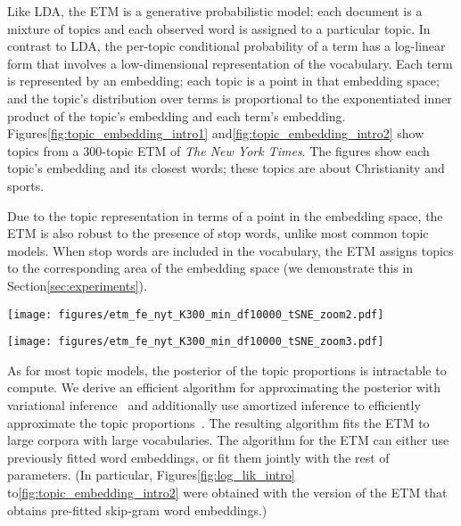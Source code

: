 \documentclass[11pt,a4paper]{article}
\begin{document}
Like \gls{LDA}, the \gls{ETM} is a generative probabilistic model:
each document is a mixture of topics and each observed word is
assigned to a particular topic.  In contrast to \gls{LDA},
the per-topic conditional probability of a term has a log-linear form
that involves a low-dimensional representation of the vocabulary.
Each term is represented by an embedding; each topic is a point in
that embedding space; and the topic's distribution over terms is
proportional to the exponentiated inner product of the topic's
embedding and each term's embedding.  Figures\nobreakspace \ref {fig:topic_embedding_intro1} and\nobreakspace  \ref {fig:topic_embedding_intro2}
show topics from a $300$-topic \gls{ETM} of \textit{The New York Times}. The figures show each topic's embedding and its closest words; these topics are about Christianity and sports.

Due to the topic representation in terms of a point in the embedding space,
the \gls{ETM} is also robust to the presence of stop words, unlike most common
topic models. When stop words are included in the vocabulary, the \gls{ETM}
assigns topics to the corresponding area of the embedding space
(we demonstrate this in Section\nobreakspace \ref {sec:experiments}).

\begin{figure*}[t]
\centering
\begin{minipage}{.45\textwidth}
  \centering
  \texttt{[image: figures/etm\_fe\_nyt\_K300\_min\_df10000\_tSNE\_zoom2.pdf]}
  \label{fig:topic_embedding_intro1}
\end{minipage}\hspace*{1cm}
\begin{minipage}{.45\textwidth}
  \centering
  \texttt{[image: figures/etm\_fe\_nyt\_K300\_min\_df10000\_tSNE\_zoom3.pdf]}
  \label{fig:topic_embedding_intro2}
\end{minipage}
\end{figure*}

As for most topic models, the posterior of the topic
proportions is intractable to compute.  We derive an efficient
algorithm for approximating the posterior with variational
inference~\citep{Jordan1999,Hoffman2013,Blei2017} and additionally use
amortized inference to efficiently approximate the topic
proportions~\citep{kingma2014autoencoding, rezende2014stochastic}. The
resulting algorithm fits the \gls{ETM} to large corpora with large
vocabularies.  The algorithm for the \gls{ETM} can either use previously fitted
word embeddings, or fit them jointly with the rest of parameters.
(In particular, Figures\nobreakspace  \ref {fig:log_lik_intro} to\nobreakspace  \ref {fig:topic_embedding_intro2} 
were obtained with the version of the \gls{ETM} that obtains pre-fitted
skip-gram word embeddings.)
\end{document}
